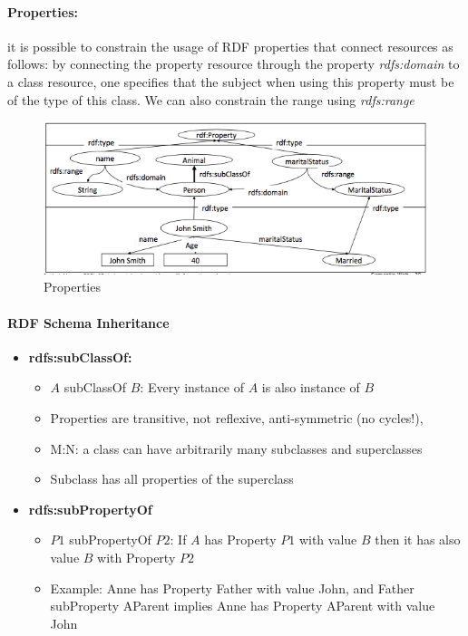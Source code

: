 \paragraph{Properties:} it is possible to constrain the usage of RDF properties that connect resources as follows: by connecting the property resource through the property \textit{rdfs:domain} to a class resource, one specifies that the subject when using this property must be of the type of this class. We can also constrain the range using \textit{rdfs:range}

\begin{figure}[H]
\begin{center}
\includegraphics[width=1\linewidth]{figures/properties.png}
\end{center}
\caption{Properties}
\label{fig:class}
\end{figure}

\paragraph{RDF Schema Inheritance}
\begin{itemize}
	\item \bf{rdfs:subClassOf:}
		\begin{itemize}
			\item $A$ subClassOf $B$: Every instance of $A$ is also instance of $B$
			\item Properties are transitive, not reflexive, anti-symmetric (no cycles!),
			\item M:N: a class can have arbitrarily many subclasses and superclasses
			\item Subclass has all properties of the superclass
		\end{itemize}
	\item \bf{rdfs:subPropertyOf}
		\begin{itemize}
			\item $P1$ subPropertyOf $P2$: If $A$ has Property $P1$ with value $B$ then it has also value $B$ with Property $P2$
			\item Example: Anne has Property Father with value John, and Father subProperty AParent implies Anne has Property AParent with value John
		\end{itemize}
\end{itemize}

